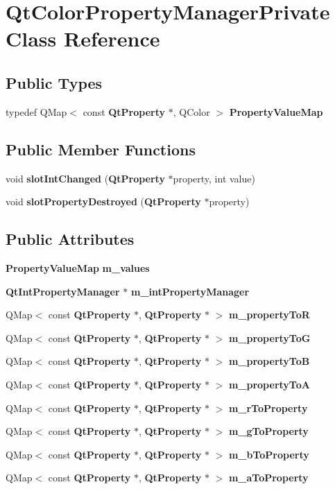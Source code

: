 \section{Qt\+Color\+Property\+Manager\+Private Class Reference}
\label{classQtColorPropertyManagerPrivate}
\subsection*{Public Types}
\begin{DoxyCompactItemize}
\item 
typedef Q\+Map$<$ const {\bf Qt\+Property} $\ast$, Q\+Color $>$ {\bf Property\+Value\+Map}
\end{DoxyCompactItemize}
\subsection*{Public Member Functions}
\begin{DoxyCompactItemize}
\item 
void {\bf slot\+Int\+Changed} ({\bf Qt\+Property} $\ast$property, int value)
\item 
void {\bf slot\+Property\+Destroyed} ({\bf Qt\+Property} $\ast$property)
\end{DoxyCompactItemize}
\subsection*{Public Attributes}
\begin{DoxyCompactItemize}
\item 
{\bf Property\+Value\+Map} {\bf m\+\_\+values}
\item 
{\bf Qt\+Int\+Property\+Manager} $\ast$ {\bf m\+\_\+int\+Property\+Manager}
\item 
Q\+Map$<$ const {\bf Qt\+Property} $\ast$, {\bf Qt\+Property} $\ast$ $>$ {\bf m\+\_\+property\+ToR}
\item 
Q\+Map$<$ const {\bf Qt\+Property} $\ast$, {\bf Qt\+Property} $\ast$ $>$ {\bf m\+\_\+property\+ToG}
\item 
Q\+Map$<$ const {\bf Qt\+Property} $\ast$, {\bf Qt\+Property} $\ast$ $>$ {\bf m\+\_\+property\+ToB}
\item 
Q\+Map$<$ const {\bf Qt\+Property} $\ast$, {\bf Qt\+Property} $\ast$ $>$ {\bf m\+\_\+property\+ToA}
\item 
Q\+Map$<$ const {\bf Qt\+Property} $\ast$, {\bf Qt\+Property} $\ast$ $>$ {\bf m\+\_\+r\+To\+Property}
\item 
Q\+Map$<$ const {\bf Qt\+Property} $\ast$, {\bf Qt\+Property} $\ast$ $>$ {\bf m\+\_\+g\+To\+Property}
\item 
Q\+Map$<$ const {\bf Qt\+Property} $\ast$, {\bf Qt\+Property} $\ast$ $>$ {\bf m\+\_\+b\+To\+Property}
\item 
Q\+Map$<$ const {\bf Qt\+Property} $\ast$, {\bf Qt\+Property} $\ast$ $>$ {\bf m\+\_\+a\+To\+Property}
\end{DoxyCompactItemize}



